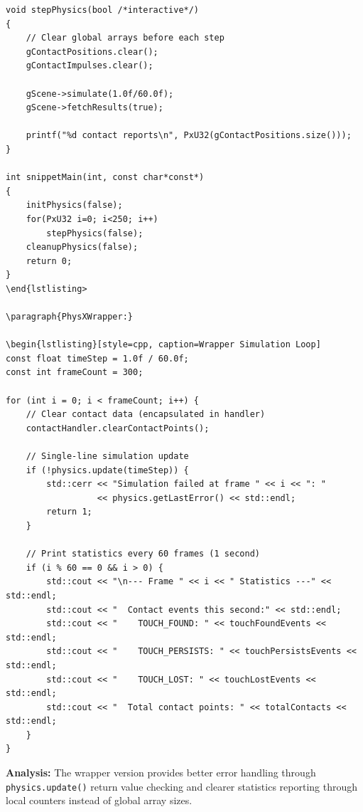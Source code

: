\begin{lstlisting}[style=cpp, caption=Original Simulation Loop]
void stepPhysics(bool /*interactive*/)
{
    // Clear global arrays before each step
    gContactPositions.clear();
    gContactImpulses.clear();

    gScene->simulate(1.0f/60.0f);
    gScene->fetchResults(true);

    printf("%d contact reports\n", PxU32(gContactPositions.size()));
}

int snippetMain(int, const char*const*)
{
    initPhysics(false);
    for(PxU32 i=0; i<250; i++)
        stepPhysics(false);
    cleanupPhysics(false);
    return 0;
}
\end{lstlisting>

\paragraph{PhysXWrapper:}

\begin{lstlisting}[style=cpp, caption=Wrapper Simulation Loop]
const float timeStep = 1.0f / 60.0f;
const int frameCount = 300;

for (int i = 0; i < frameCount; i++) {
    // Clear contact data (encapsulated in handler)
    contactHandler.clearContactPoints();

    // Single-line simulation update
    if (!physics.update(timeStep)) {
        std::cerr << "Simulation failed at frame " << i << ": "
                  << physics.getLastError() << std::endl;
        return 1;
    }

    // Print statistics every 60 frames (1 second)
    if (i % 60 == 0 && i > 0) {
        std::cout << "\n--- Frame " << i << " Statistics ---" << std::endl;
        std::cout << "  Contact events this second:" << std::endl;
        std::cout << "    TOUCH_FOUND: " << touchFoundEvents << std::endl;
        std::cout << "    TOUCH_PERSISTS: " << touchPersistsEvents << std::endl;
        std::cout << "    TOUCH_LOST: " << touchLostEvents << std::endl;
        std::cout << "  Total contact points: " << totalContacts << std::endl;
    }
}
\end{lstlisting}

\textbf{Analysis:} The wrapper version provides better error handling through \texttt{physics.update()} return value checking and clearer statistics reporting through local counters instead of global array sizes.


